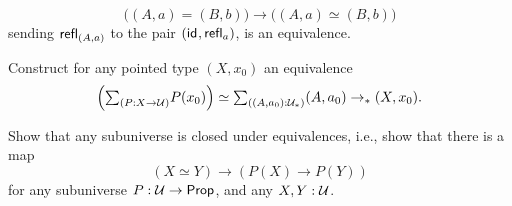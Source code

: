 \begin{exercises}
\begin{subexenum}
\begin{equation*}
      \big((A,a)=(B,b)\big)\to \Big((A,a)\simeq (B,b)\Big)
    \end{equation*}
    sending $\mathsf{refl}_{(A,a)}$ to the pair $(\mathsf{id}_{},\mathsf{refl}_{a})$, is an equivalence.
  \item Construct for any pointed type $(X,x_0)$ an equivalence
    \begin{equation*}
      \Big(\sm{P:X\to \UU}P(x_0)\Big)\simeq \sm{(A,a_0):\UU_\ast}(A,a_0)\to_\ast(X,x_0).
    \end{equation*}
  \end{subexenum}
\item Show that any subuniverse is closed under equivalences, i.e., show that there is a map
  \begin{equation*}
    (X\simeq Y) \to (P(X)\to P(Y))
  \end{equation*}
  for any subuniverse $P:\mathcal{U}\to\mathsf{Prop}$, and any $X,Y:\mathcal{U}$. 
\end{exercises}
